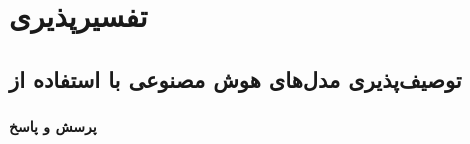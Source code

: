 \def \Subject {تفسیرپذیری}
\def \Session { یک}
\renewcommand{\chaptername}{سوال}
\chapter{\Subject}

\section{توصیف‌پذیری مدل‌های هوش مصنوعی با استفاده از }

\subsection{}

\subsubsection{پرسش و پاسخ}


